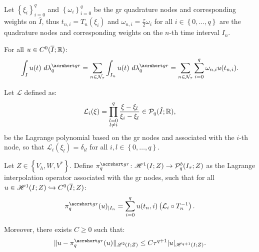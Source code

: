 Let $\left\{ \xi_i \right\}_{i = 0}^{q}$ and $\left\{ \omega_i \right\}_{i = 0}^{q}$ be the \acrlong{gr} quadrature nodes and corresponding weights on $\hat{I}$, thus $t_{n, i} = T_n(\xi_i)$ and $\omega_{n, i} = \frac{\tau}{2} \omega_i$ for all $i \in \left\{ 0, \dots, q \right\}$ are the quadrature nodes and corresponding weights on the $n$-th time interval $I_n$.

\begin{definition}[$\lambdaGR_q$]
    For all $u \in C^0(\overline{I}; \mathbb{R})$:
    \begin{gather}
        \int_I u(t) ~ d \lambdaGR_q = \sum_{n \in \TimeIndices} \int_{I_n} u(t) ~ d \lambdaGR_q = \sum_{n \in \TimeIndices} \sum_{i = 0}^q \omega_{n, i} u(t_{n, i}).
    \end{gather}
\end{definition}

\begin{definition}
    Let $\mathcal{L}$ defined as:
    \begin{gather}
        \mathcal{L}_i (\xi) = \prod_{\substack{l = 0 \\ l \neq i}}^q \frac{\xi - \xi_l}{\xi_i - \xi_l} \in \mathcal{P}_{q}(\hat{I}; \mathbb{R}),
    \end{gather}
    be the Lagrange polynomial based on the \acrshort{gr} nodes and associated with the $i$-th node, so that $\mathcal{L}_i (\xi_l) = \delta_{i l}$ for all $i, l \in \left\{ 0, \dots, q\right\}$.
\end{definition}

\begin{definition}[$\InterpolantGR_q$]
    Let $Z \in \left\{V_h, W, V^* \right\}$. Define $\InterpolantGR_q \colon \SpaceHk{1}(I; Z) \rightarrow \SpacePolynomials{q}^b(\TimeMesh; Z)$ as the Lagrange interpolation operator associated with the \acrshort{gr} nodes, such that for all $u \in \mathscr{H}^{1}(I; Z) \hookrightarrow C^0(\overline{I}; Z)$:
    \begin{gather}
        \InterpolantGR_q(u)_{\mid I_n} = \sum_{i = 0}^q u(t_n, i) \left( \mathcal{L}_i \circ T_n^{-1} \right).
    \end{gather}

    Moreover, there exists $C \geq 0$ such that:
    \begin{gather}
        \lVert u - \InterpolantGR_q(u) \rVert_{\SpaceLp{2}(I; Z)} \leq C \tau^{q + 1} \lvert u \rvert_{\SpaceHk{q + 1}(I; Z)}.
    \end{gather}
\end{definition}

